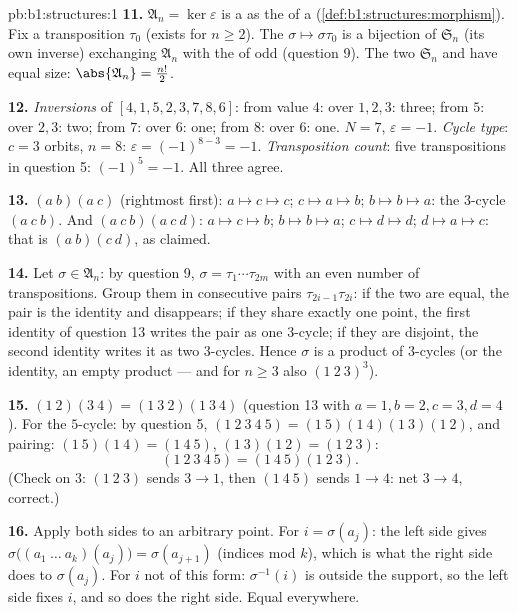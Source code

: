 \begin{solution}{pb:b1:structures:1}
\textbf{11.} $\mathfrak A_n = \ker\varepsilon$ is a  as
the  of a  (\cref{def:b1:structures:morphism}). Fix
a transposition $\tau_0$ (exists for $n \geq 2$). The  $\sigma
\mapsto \sigma\tau_0$ is a bijection of $\mathfrak S_n$ (its own
inverse) exchanging $\mathfrak A_n$ with the  of odd
 (question 9). The two   $\mathfrak S_n$
and have equal size: $\abs{\mathfrak A_n} = \frac{n!}2$.

\textbf{12.} \emph{Inversions} of $[4, 1, 5, 2, 3, 7, 8, 6]$: from
value $4$: over $1, 2, 3$: three; from $5$: over $2, 3$: two;
from $7$: over $6$: one; from $8$: over $6$: one. $N = 7$,
$\varepsilon = -1$. \emph{Cycle type}: $c = 3$ orbits, $n = 8$:
$\varepsilon = (-1)^{8-3} = -1$. \emph{Transposition count}: five
transpositions in question 5: $(-1)^5 = -1$. All three agree.

\textbf{13.} $(a\ b)(a\ c)$ (rightmost first): $a \mapsto c
\mapsto c$; $c \mapsto a \mapsto b$; $b \mapsto b \mapsto a$:
the $3$-cycle $(a\ c\ b)$. And $(a\ c\ b)(a\ c\ d)$: $a \mapsto c
\mapsto b$; $b \mapsto b \mapsto a$; $c \mapsto d \mapsto d$; $d
\mapsto a \mapsto c$: that is $(a\ b)(c\ d)$, as claimed.

\textbf{14.} Let $\sigma \in \mathfrak A_n$: by question 9,
$\sigma = \tau_1\cdots\tau_{2m}$ with an even number of
transpositions. Group them in consecutive pairs
$\tau_{2i-1}\tau_{2i}$: if the two are equal, the pair is the
identity and disappears; if they share exactly one point, the
first identity of question 13 writes the pair as one $3$-cycle;
if they are disjoint, the second identity writes it as two
$3$-cycles. Hence $\sigma$ is a product of $3$-cycles (or the
identity, an empty product --- and for $n \geq 3$ also $(1\ 2\
3)^3$).

\textbf{15.} $(1\ 2)(3\ 4) = (1\ 3\ 2)(1\ 3\ 4)$ (question 13
with $a{=}1, b{=}2, c{=}3, d{=}4$). For the $5$-cycle: by
question 5, $(1\ 2\ 3\ 4\ 5) = (1\ 5)(1\ 4)(1\ 3)(1\ 2)$, and
pairing: $(1\ 5)(1\ 4) = (1\ 4\ 5)$, $(1\ 3)(1\ 2) = (1\ 2\ 3)$:
\[
(1\ 2\ 3\ 4\ 5) = (1\ 4\ 5)(1\ 2\ 3) .
\]
(Check on $3$: $(1\ 2\ 3)$ sends $3 \to 1$, then $(1\ 4\ 5)$
sends $1 \to 4$: net $3 \to 4$, correct.)

\textbf{16.} Apply both sides to an arbitrary point. For $i =
\sigma(a_j)$: the left side gives $\sigma\bigl((a_1\ \dots\
a_k)(a_j)\bigr) = \sigma(a_{j+1})$ (indices mod $k$), which is
what the right side does to $\sigma(a_j)$. For $i$ not of this
form: $\sigma^{-1}(i)$ is outside the support, so the left side
fixes $i$, and so does the right side. Equal everywhere.


\end{solution}
